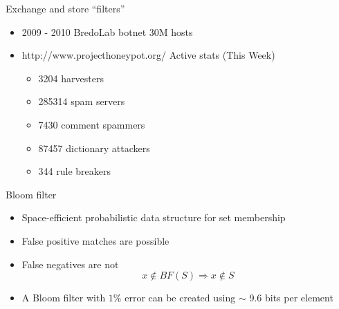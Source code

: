 \documentclass{beamer}
\begin{document}
\begin{frame}{Exchange and store ``filters''}
  \begin{itemize}
  \item 2009 - 2010 BredoLab botnet 30M hosts
  \item http://www.projecthoneypot.org/ Active stats (This Week)
  \begin{itemize}
      \item 3204 harvesters
      \item 285314 spam servers
      \item 7430 comment spammers
      \item 87457 dictionary attackers
      \item 344 rule breakers
    \end{itemize}
  \end{itemize}
\end{frame}

\begin{frame}{Bloom filter}
  \begin{itemize}
  \item Space-efficient probabilistic data structure for set membership
  \item False positive matches are possible
  \item False negatives are not
    \[
      x \not \in BF(S) \Rightarrow x \not \in S
    \]
  \item  A Bloom filter with $1\%$ error can be created using
    $\sim$ 9.6 bits per element
  \end{itemize}
\end{frame}
\end{document}
